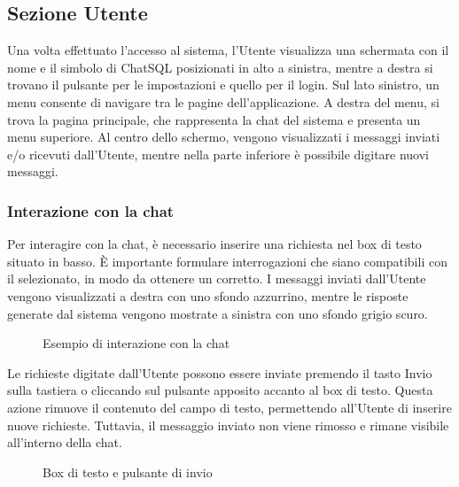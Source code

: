 \subsection{Sezione Utente}
\label{sec:sezUtente}

\par Una volta effettuato l'accesso al sistema, l'Utente visualizza una schermata con il nome e il simbolo di ChatSQL posizionati in alto a sinistra, mentre a destra si trovano il pulsante per le impostazioni e quello per il login. Sul lato sinistro, un menu consente di navigare tra le pagine dell'applicazione. A destra del menu, si trova la pagina principale, che rappresenta la chat del sistema e presenta un menu superiore. Al centro dello schermo, vengono visualizzati i messaggi inviati e/o ricevuti dall'Utente, mentre nella parte inferiore è possibile digitare nuovi messaggi.

\subsubsection{Interazione con la chat} \label{sec:interazione-chat}

\par Per interagire con la chat, è necessario inserire una richiesta nel box di testo situato in basso. È importante formulare interrogazioni che siano compatibili con il  selezionato, in modo da ottenere un  corretto. I messaggi inviati dall'Utente vengono visualizzati a destra con uno sfondo azzurrino, mentre le risposte generate dal sistema vengono mostrate a sinistra con uno sfondo grigio scuro.

\begin{figure}[H]
  \centering
  \caption{Esempio di interazione con la chat}
\end{figure}

\par Le richieste digitate dall'Utente possono essere inviate premendo il tasto Invio sulla tastiera o cliccando sul pulsante apposito accanto al box di testo. Questa azione rimuove il contenuto del campo di testo, permettendo all'Utente di inserire nuove richieste. Tuttavia, il messaggio inviato non viene rimosso e rimane visibile all'interno della chat.

\begin{figure}[H]
  \centering
  \caption{Box di testo e pulsante di invio}
\end{figure}

